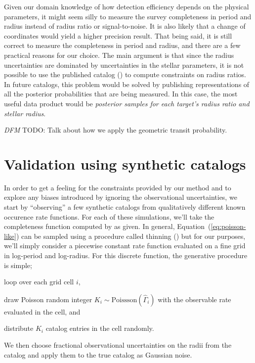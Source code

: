 \documentclass[12pt,preprint]{aastex}
\newcommand{\Eq}[1]{Equation~(\ref{eq:#1})}
\newcommand{\eq}[1]{\Eq{#1}}
\newcommand{\todo}[3]{{\color{#2} \emph{#1} TODO: #3}}
\newcommand{\dfmtodo}[1]{\todo{DFM}{red}{#1}}
\newcommand{\rate}{\ensuremath{\Gamma}}
\newcommand{\obs}[1]{\ensuremath{\hat{#1}}}
\begin{document}
Given our domain knowledge of how detection efficiency depends on the physical
parameters, it might seem silly to measure the survey completeness in period
and radius instead of radius ratio or signal-to-noise.
It is also likely that a change of coordinates would yield a higher precision
result.
That being said, it is still correct to measure the completeness in period and
radius, and there are a few practical reasons for our choice.
The main argument is that since the radius uncertainties are dominated by
uncertainties in the stellar parameters, it is not possible to use the
published catalog (\citealt{petigura}) to compute constraints on radius
ratios.
In future catalogs, this problem would be solved by publishing representations
of all the posterior probabilities that are being measured.
In this case, the most useful data product would be \emph{posterior samples
for each target's radius ratio and stellar radius}.

\dfmtodo{Talk about how we apply the geometric transit probability.}

\section{Validation using synthetic catalogs}

In order to get a feeling for the constraints provided by our method and to
explore any biases introduced by ignoring the observational uncertainties, we
start by ``observing'' a few synthetic catalogs from qualitatively different
known occurence rate functions.
For each of these simulations, we'll take the completeness function computed
by \citet{petigura} as given.
In general, \eq{poisson-like} can be sampled using a procedure called thinning
(\citealt{poisson}) but for our purposes, we'll simply consider a piecewise
constant rate function evaluated on a fine grid in log-period and log-radius.
For this discrete function, the generative procedure is simple;
\begin{enumerate}
{\item loop over each grid cell $i$,}
{\item draw Poisson random integer $K_i\sim\mathrm{Poissson}(\obs{\rate}_i)$
with the observable rate evaluated in the cell, and}
{\item distribute $K_i$ catalog entries in the cell randomly.}
\end{enumerate}
We then choose fractional observational uncertainties on the radii from the
\citet{petigura} catalog and apply them to the true catalog as Gaussian noise.
\end{document}
